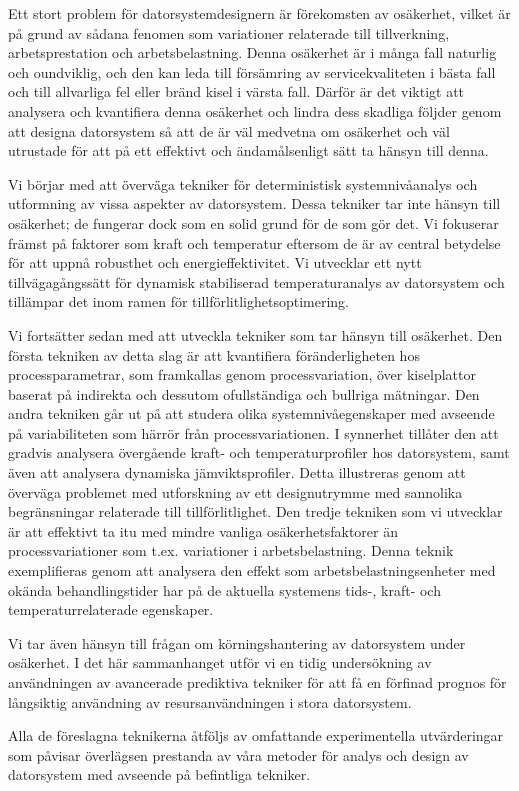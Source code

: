 Ett stort problem för datorsystemdesignern är förekomsten av osäkerhet, vilket
är på grund av sådana fenomen som variationer relaterade till tillverkning,
arbetsprestation och arbetsbelastning. Denna osäkerhet är i många fall naturlig
och oundviklig, och den kan leda till försämring av servicekvaliteten i bästa
fall och till allvarliga fel eller bränd kisel i värsta fall. Därför är det
viktigt att analysera och kvantifiera denna osäkerhet och lindra dess skadliga
följder genom att designa datorsystem så att de är väl medvetna om osäkerhet och
väl utrustade för att på ett effektivt och ändamålsenligt sätt ta hänsyn till
denna.

Vi börjar med att överväga tekniker för deterministisk systemnivåanalys och
utformning av vissa aspekter av datorsystem. Dessa tekniker tar inte hänsyn till
osäkerhet; de fungerar dock som en solid grund för de som gör det. Vi fokuserar
främst på faktorer som kraft och temperatur eftersom de är av central betydelse
för att uppnå robusthet och energieffektivitet. Vi utvecklar ett nytt
tillvägagångssätt för dynamisk stabiliserad temperaturanalys av datorsystem och
tillämpar det inom ramen för tillförlitlighetsoptimering.

Vi fortsätter sedan med att utveckla tekniker som tar hänsyn till osäkerhet. Den
första tekniken av detta slag är att kvantifiera föränderligheten hos
processparametrar, som framkallas genom processvariation, över kiselplattor
baserat på indirekta och dessutom ofullständiga och bullriga mätningar. Den
andra tekniken går ut på att studera olika systemnivåegenskaper med avseende på
variabiliteten som härrör från processvariationen. I synnerhet tillåter den att
gradvis analysera övergående kraft- och temperaturprofiler hos datorsystem, samt
även att analysera dynamiska jämviktsprofiler. Detta illustreras genom att
överväga problemet med utforskning av ett designutrymme med sannolika
begränsningar relaterade till tillförlitlighet. Den tredje tekniken som vi
utvecklar är att effektivt ta itu med mindre vanliga osäkerhetsfaktorer än
processvariationer som t.ex. variationer i arbetsbelastning. Denna teknik
exemplifieras genom att analysera den effekt som arbetsbelastningsenheter med
okända behandlingstider har på de aktuella systemens tids-, kraft- och
temperaturrelaterade egenskaper.

Vi tar även hänsyn till frågan om körningshantering av datorsystem under
osäkerhet. I det här sammanhanget utför vi en tidig undersökning av användningen
av avancerade prediktiva tekniker för att få en förfinad prognos för långsiktig
användning av resursanvändningen i stora datorsystem.

Alla de föreslagna teknikerna åtföljs av omfattande experimentella utvärderingar
som påvisar överlägsen prestanda av våra metoder för analys och design av
datorsystem med avseende på befintliga tekniker.

